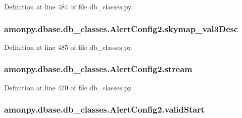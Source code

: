 Definition at line 484 of file db\-\_\-classes.\-py.

\hypertarget{classamonpy_1_1dbase_1_1db__classes_1_1_alert_config2_a6c28894bd6690a2b0faeb36be8eb351f}{
\subsubsection[{skymap\-\_\-val3\-Desc}]{\setlength{\rightskip}{0pt plus 5cm}amonpy.\-dbase.\-db\-\_\-classes.\-Alert\-Config2.\-skymap\-\_\-val3\-Desc}}\label{classamonpy_1_1dbase_1_1db__classes_1_1_alert_config2_a6c28894bd6690a2b0faeb36be8eb351f}


Definition at line 485 of file db\-\_\-classes.\-py.

\hypertarget{classamonpy_1_1dbase_1_1db__classes_1_1_alert_config2_a49f8af0cfc12e4f73da64323780102e8}{
\subsubsection[{stream}]{\setlength{\rightskip}{0pt plus 5cm}amonpy.\-dbase.\-db\-\_\-classes.\-Alert\-Config2.\-stream}}\label{classamonpy_1_1dbase_1_1db__classes_1_1_alert_config2_a49f8af0cfc12e4f73da64323780102e8}


Definition at line 470 of file db\-\_\-classes.\-py.

\hypertarget{classamonpy_1_1dbase_1_1db__classes_1_1_alert_config2_ac8bd043fc32dc2de20f5ee1cf57762e7}{
\subsubsection[{valid\-Start}]{\setlength{\rightskip}{0pt plus 5cm}amonpy.\-dbase.\-db\-\_\-classes.\-Alert\-Config2.\-valid\-Start}}\label{classamonpy_1_1dbase_1_1db__classes_1_1_alert_config2_ac8bd043fc32dc2de20f5ee1cf57762e7}


